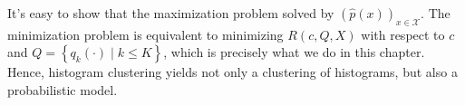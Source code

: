 It's easy to show that the maximization problem solved by $\left(\hat{p}(x)\right)_{x \in \mathcal{X}}$. The minimization problem is equivalent to minimizing $R(c,Q, X)$ with respect to $c$ and $Q = \left\{q_k(\cdot) \mid k \leq K\right\}$, which is precisely what we do in this chapter. Hence, histogram clustering yields not only a clustering of histograms, but also a probabilistic model.